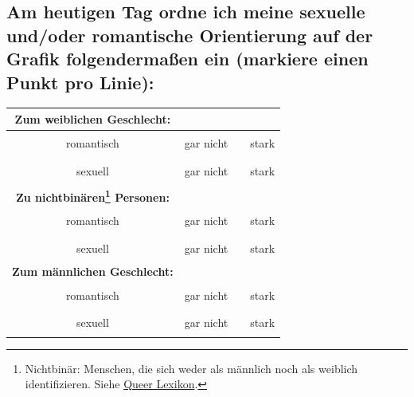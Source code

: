 \documentclass[a4paper,12pt]{article}
\begin{document}
\subsection*{Am heutigen Tag ordne ich meine sexuelle und/oder romantische Orientierung auf der Grafik folgendermaßen ein (markiere einen Punkt pro Linie):}

\begin{tabular}{|c|c|c|c|}
    \hline
    \textbf{Zum weiblichen Geschlecht:} & & & \\  
    \hline
    romantisch & gar nicht & \rule{5cm}{0.2pt} & stark \\
    sexuell & gar nicht & \rule{5cm}{0.2pt} & stark \\
    \hline
    \textbf{Zu nichtbinären\footnote{Nichtbinär: Menschen, die sich weder als männlich noch als weiblich identifizieren. Siehe \href{https://queer-lexikon.net/uebersichtsseiten/trans/}{Queer Lexikon}.} Personen:} & & & \\  
    \hline
    romantisch & gar nicht & \rule{5cm}{0.2pt} & stark \\
    sexuell & gar nicht & \rule{5cm}{0.2pt} & stark \\
    \hline
    \textbf{Zum männlichen Geschlecht:} & & & \\  
    \hline
    romantisch & gar nicht & \rule{5cm}{0.2pt} & stark \\
    sexuell & gar nicht & \rule{5cm}{0.2pt} & stark \\
    \hline
\end{tabular}
\end{document}
